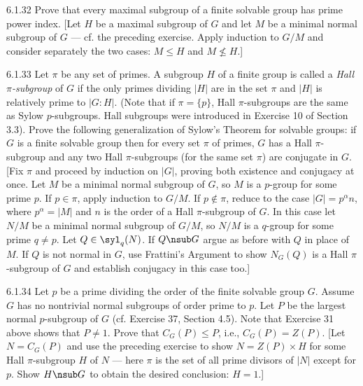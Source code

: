 \begin{exercise}{6.1.32}
    Prove that every maximal subgroup of a finite solvable group has prime power index.
    [Let $H$ be a maximal subgroup of $G$ and let $M$ be a minimal normal subgroup of $G$ — cf. the preceding exercise.
    Apply induction to $G/M$ and consider separately the two cases: $M \leq H$ and $M \not\leq H$.]
\end{exercise}

\begin{exercise}{6.1.33}
    Let $\pi$ be any set of primes.
    A subgroup $H$ of a finite group is called a \emph{Hall $\pi$-subgroup} of $G$ if the only primes dividing $|H|$ are in the set $\pi$ and $|H|$ is relatively prime to $|G:H|$.
    (Note that if $\pi = \{p\}$, Hall $\pi$-subgroups are the same as Sylow $p$-subgroups. Hall subgroups were introduced in Exercise 10 of Section 3.3).
    Prove the following generalization of Sylow's Theorem for solvable groups: if $G$ is a finite solvable group then for every set $\pi$ of primes, $G$ has a Hall $\pi$-subgroup and any two Hall $\pi$-subgroups (for the same set $\pi$) are conjugate in $G$.
    [Fix $\pi$ and proceed by induction on $|G|$, proving both existence and conjugacy at once.
    Let $M$ be a minimal normal subgroup of $G$, so $M$ is a $p$-group for some prime $p$.
    If $p \in \pi$, apply induction to $G/M$.
    If $p \notin \pi$, reduce to the case $|G| = p^\alpha n$, where $p^\alpha = |M|$ and $n$ is the order of a Hall $\pi$-subgroup of $G$.
    In this case let $N/M$ be a minimal normal subgroup of $G/M$, so $N/M$ is a $q$-group for some prime $q \neq p$.
    Let $Q \in \syl_q(N)$.
    If $Q \nsub G$ argue as before with $Q$ in place of $M$.
    If $Q$ is not normal in $G$, use Frattini's Argument to show $N_G(Q)$ is a Hall $\pi$-subgroup of $G$ and establish conjugacy in this case too.]
\end{exercise}

\begin{exercise}{6.1.34}
    Let $p$ be a prime dividing the order of the finite solvable group $G$.
    Assume $G$ has no nontrivial normal subgroups of order prime to $p$.
    Let $P$ be the largest normal $p$-subgroup of $G$ (cf. Exercise 37, Section 4.5).
    Note that Exercise 31 above shows that $P \neq 1$.
    Prove that $C_G(P) \leq P$, i.e., $C_G(P) = Z(P)$.
    [Let $N = C_G(P)$ and use the preceding exercise to show $N = Z(P) \times H$ for some Hall $\pi$-subgroup $H$ of $N$ — here $\pi$ is the set of all prime divisors of $|N|$ except for $p$.
    Show $H \nsub G$ to obtain the desired conclusion: $H = 1$.]
\end{exercise}


